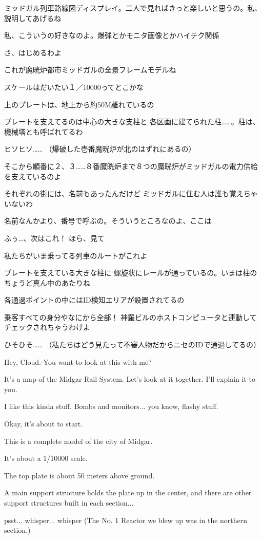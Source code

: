 \documentclass[10pt]{book}
\newcommand{\leaveSpace}{\vspace{0.0625in}}
\newenvironment{paracolSection}
    {\begin{paracol}{2}
    \selectlanguage{japanese}
    }
    {
    \end{paracol}
    \leaveSpace
    }
\begin{document}
\begin{paracolSection}
{ミッドガル列車路線図ディスプレイ。二人で見ればきっと楽しいと思うの。私、説明してあげるね

私、こういうの好きなのよ。爆弾とかモニタ画像とかハイテク関係

さ、はじめるわよ

これが魔晄炉都市ミッドガルの全景フレームモデルね

スケールはだいたい１／10000ってとこかな

上のプレートは、地上から約50M離れているの

プレートを支えてるのは中心の大きな支柱と 各区画に建てられた柱……。柱は、機械塔とも呼ばれてるわ

ヒソヒソ…… （爆破した壱番魔晄炉が北のはずれにあるの）

そこから順番に２、３……８番魔晄炉まで８つの魔晄炉がミッドガルの電力供給を支えているのよ

それぞれの街には、名前もあったんだけど ミッドガルに住む人は誰も覚えちゃいないわ

名前なんかより、番号で呼ぶの。そういうところなのよ、ここは

ふぅ…、次はこれ！ ほら、見て

私たちがいま乗ってる列車のルートがこれよ

プレートを支えている大きな柱に 螺旋状にレールが通っているの。いまは柱のちょうど真ん中のあたりね

各通過ポイントの中にはID検知エリアが設置されてるの

乗客すべての身分やなにから全部！ 神羅ビルのホストコンピュータと連動してチェックされちゃうわけよ

ひそひそ…… （私たちはどう見たって不審人物だからニセのIDで通過してるの）}
{Hey, Cloud. You want to look at this with me?

It's a map of the Midgar Rail System. Let's look at it together. I'll explain it to you.

I like this kinda stuff. Bombs and monitors... you know, flashy stuff.

Okay, it's about to start.

This is a complete model of the city of Midgar.

It's about a 1/10000 scale.

The top plate is about 50 meters above ground.

A main support structure holds the plate up in the center, and there are other support structures built in each section...

psst... whisper... whisper (The No. 1 Reactor we blew up was in the northern section.)

}
\end{paracolSection}
\end{document}
